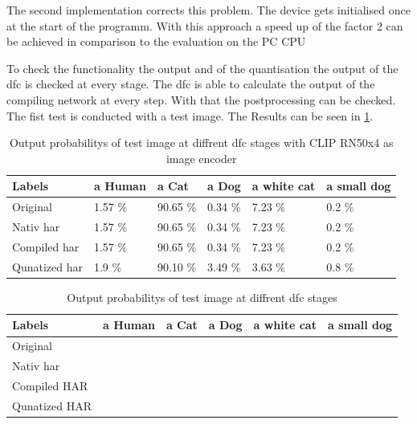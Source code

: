 The second implementation corrects this problem.
The device gets initialised once at the start of the programm.
With this approach a speed up of the factor 2 can be achieved in comparison to the evaluation on the PC CPU

To check the functionality the output and of the quantisation the output of the \acrshort{dfc} is checked at every stage.
The \acrshort{dfc} is able to calculate the output of the compiling network at every step.
With that the postprocessing can be checked.
The fist test is conducted with a test image.
The Results can be seen in \cref{tab:methods:clipcompare}.

\begin{table}[]
    \centering
    \begin{tabular}{llllll}
    \hline
    Labels        & a Human & a Cat   & a Dog  & a white cat & a small dog \\ \hline
    Original      & 1.57 \%  & 90.65 \% & 0.34 \% & 7.23 \%      & 0.2 \%       \\
    Nativ \acrshort{har}        & 1.57 \%  & 90.65 \% & 0.34 \% & 7.23 \%      & 0.2 \%       \\
    Compiled \acrshort{har}     & 1.57 \%  & 90.65 \% & 0.34 \% & 7.23 \%      & 0.2 \%       \\
    Qunatized \acrshort{har}    & 1.9 \%   & 90.10 \% & 3.49 \% & 3.63 \%      & 0.8 \%       \\ \hline
    \end{tabular}
    \caption{Output probabilitys of test image at diffrent \acrshort{dfc} stages with CLIP RN50x4 as image encoder}
    \label{tab:methods:clipcompare}
\end{table}

\begin{table}
    \centering
    \begin{tabular}{llllll}
    \hline
    Labels        & a Human & a Cat & a Dog & a white cat & a small dog \\ \hline
    Original      &         &       &       &             &             \\
    Nativ \acrshort{har}     &         &       &       &             &             \\
    Compiled HAR  &         &       &       &             &             \\
    Qunatized HAR &         &       &       &             &                   
    \end{tabular}
    \caption{Output probabilitys of test image at diffrent \acrshort{dfc} stages
    \label{tab:methods:tinyclipcompare}}
\end{table}

